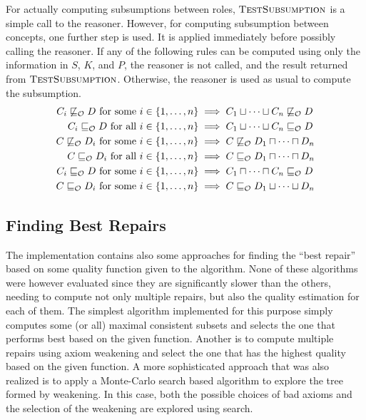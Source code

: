 For actually computing subsumptions between roles, $\textsc{TestSubsumption}$ is a simple call to the reasoner. However, for computing subsumption between concepts, one further step is used. It is applied immediately before possibly calling the reasoner. If any of the following rules can be computed using only the information in $S$, $K$, and $P$, the reasoner is not called, and the result returned from $\textsc{TestSubsumption}$. Otherwise, the reasoner is used as usual to compute the subsumption.
\begin{align*}
  C_i \not\sqsubseteq_\mathcal{O} D \text{ for some } i \in \{ 1, \dots, n \} &\implies C_1 \sqcup \cdots \sqcup C_n \not\sqsubseteq_\mathcal{O} D \\
  C_i \sqsubseteq_\mathcal{O} D \text{ for all } i \in \{ 1, \dots, n \} &\implies C_1 \sqcup \cdots \sqcup C_n \sqsubseteq_\mathcal{O} D \\
  C \not\sqsubseteq_\mathcal{O} D_i \text{ for some } i \in \{ 1, \dots, n \} &\implies C \not\sqsubseteq_\mathcal{O} D_1 \sqcap \cdots \sqcap D_n \\
  C \sqsubseteq_\mathcal{O} D_i \text{ for all } i \in \{ 1, \dots, n \} &\implies C \sqsubseteq_\mathcal{O} D_1 \sqcap \cdots \sqcap D_n \\
  C_i \sqsubseteq_\mathcal{O} D \text{ for some } i \in \{ 1, \dots, n \} &\implies C_1 \sqcap \dots \sqcap C_n \sqsubseteq_\mathcal{O} D \\
  C \sqsubseteq_\mathcal{O} D_i \text{ for some } i \in \{ 1, \dots, n \} &\implies C \sqsubseteq_\mathcal{O} D_1 \sqcup \cdots \sqcup D_n \\
\end{align*}

\subsection{Finding Best Repairs}\label{best-repair-impl}

The implementation contains also some approaches for finding the ``best repair'' based on some quality function given to the algorithm. None of these algorithms were however evaluated since they are significantly slower than the others, needing to compute not only multiple repairs, but also the quality estimation for each of them. The simplest algorithm implemented for this purpose simply computes some (or all) maximal consistent subsets and selects the one that performs best based on the given function. Another is to compute multiple repairs using axiom weakening and select the one that has the highest quality based on the given function. A more sophisticated approach that was also realized is to apply a Monte-Carlo search \cite{coulom2006efficient} based algorithm to explore the tree formed by weakening. In this case, both the possible choices of bad axioms and the selection of the weakening are explored using search.

